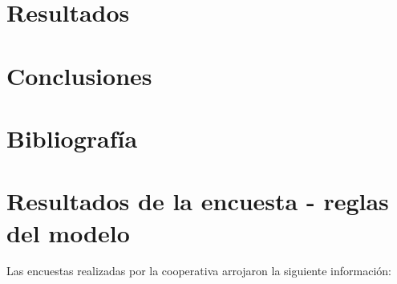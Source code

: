 \documentclass{article}
\begin{document}
\begin{itemize}
\section{Resultados}

\section{Conclusiones}

\section{Bibliografía}


\pagebreak
\section*{Resultados de la encuesta - reglas del modelo}

Las encuestas realizadas por la cooperativa arrojaron la siguiente información:


\end{itemize}
\end{document}
